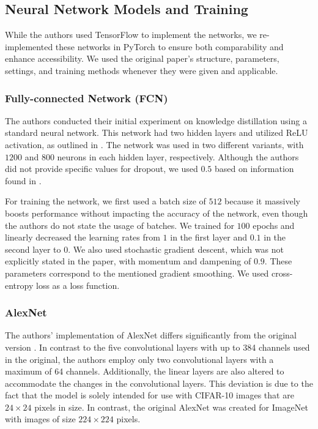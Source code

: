 \subsection{Neural Network Models and Training}
While the authors used TensorFlow \cite{Abadi2016} to implement the networks, we re-implemented these networks in PyTorch \cite{Paszke2019} to ensure both comparability and enhance accessibility. We used the original paper's structure, parameters, settings, and training methods whenever they were given and applicable.

\subsubsection{Fully-connected Network (FCN)}\label{fc_model}
The authors conducted their initial experiment on knowledge distillation using a standard neural network. This network had two hidden layers and utilized ReLU activation, as outlined in \cite{hinton2015}. The network was used in two different variants, with $1200$ and $800$ neurons in each hidden layer, respectively. Although the authors did not provide specific values for dropout, we used $0.5$ based on information found in \cite{hinton2012}.

For training the network, we first used a batch size of $512$ because it massively boosts performance without impacting the accuracy of the network, even though the authors do not state the usage of batches. We trained for $100$ epochs and linearly decreased the learning rates from $1$ in the first layer and $0.1$ in the second layer to $0$. We also used stochastic gradient descent, which was not explicitly stated in the paper, with momentum and dampening of $0.9$. These parameters correspond to the mentioned gradient smoothing. We used cross-entropy loss as a loss function.

\subsubsection{AlexNet}\label{alexnet_model}
The authors' implementation of AlexNet differs significantly from the original version \cite{krizhevsky2012}. In contrast to the five convolutional layers with up to 384 channels used in the original, the authors employ only two convolutional layers with a maximum of 64 channels. Additionally, the linear layers are also altered to accommodate the changes in the convolutional layers.
This deviation is due to the fact that the model is solely intended for use with CIFAR-10 images that are $24\times24$ pixels in size. In contrast, the original AlexNet was created for ImageNet with images of size $224\times224$ pixels.

